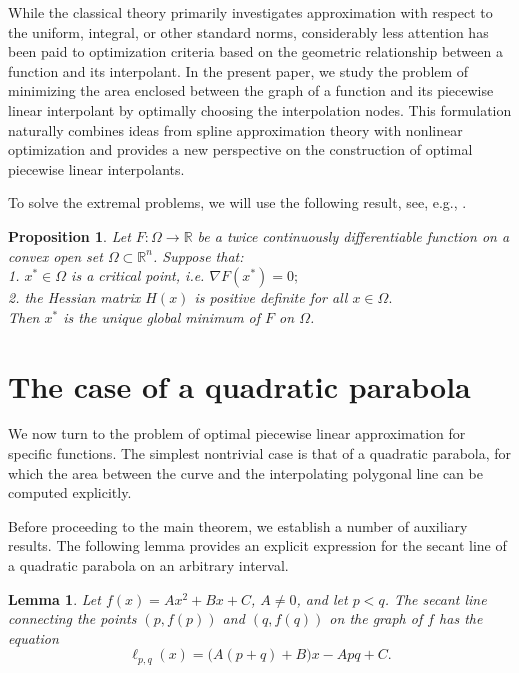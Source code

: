 \documentclass[amstex,16pt, amssymb]{article}
\theoremstyle{plain}
\newtheorem{lemma}{Lemma}[section]
\newtheorem{proposition}{Proposition}[section]
\theoremstyle{definition}
\numberwithin{equation}{section}
\numberwithin{equation}{section}
\begin{document}
While the classical theory primarily investigates approximation with respect to the uniform, integral, or other standard norms, considerably less attention has been paid to optimization criteria based on the geometric relationship between a function and its interpolant. In the present paper, we study the problem of minimizing the area enclosed between the graph of a function and its piecewise linear interpolant by optimally choosing the interpolation nodes. This formulation naturally combines ideas from spline approximation theory with nonlinear optimization and provides a new perspective on the construction of optimal piecewise linear interpolants.

\medskip

To solve the extremal problems, we will use the following result, see, e.g., \cite{Bertsekas,Boyd,Rockafellar}.

\begin{proposition}\label{prop1}
{\it Let \( F: \Omega \to \mathbb{R} \) be a twice continuously differentiable function
on a convex open set \( \Omega \subset \mathbb{R}^n \).
Suppose that:\\
1. \( x^* \in \Omega \) is a critical point, i.e. \( \nabla F(x^*) = 0; \)\\
2. the Hessian matrix \( H(x) \) is positive definite for all \( x \in \Omega. \)\\
Then \( x^* \) is the unique global minimum of \( F \) on \( \Omega \).}
\end{proposition}

\section{The case of a quadratic parabola}


We now turn to the problem of optimal piecewise linear approximation
for specific functions. The simplest nontrivial case is that of a
quadratic parabola, for which the area between the curve and the
interpolating polygonal line can be computed explicitly. 

Before proceeding to the main theorem, we establish a number of auxiliary results. The following lemma provides an explicit expression for the secant line of a quadratic parabola on an arbitrary interval.

\begin{lemma}\label{lemma1}
Let $f(x) = Ax^2 + Bx + C$, $A\neq 0$, and let $p < q$. The secant line connecting the points $(p, f(p))$ and $(q, f(q))$ on the graph of $f$ has the equation
\[
\ell_{p,q}(x) = \bigl(A(p+q) + B\bigr)x - A pq + C.
\]
\end{lemma}
\end{document}
